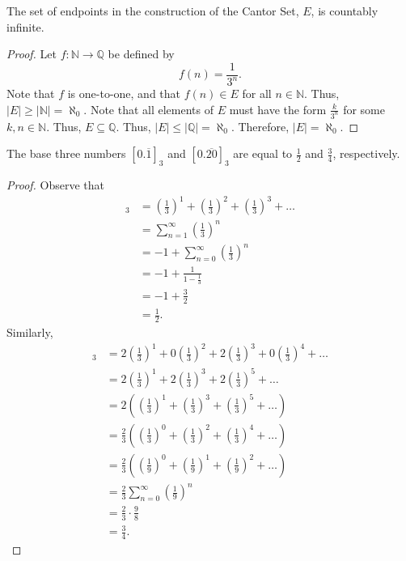\documentclass[12pt]{article}
\begin{document}
\newpage
{} The set of endpoints in the construction of the Cantor Set, $E$, is countably infinite.
\begin{proof}
    Let $f: \mathbb N \to \mathbb Q$ be defined by $$f(n) = \frac{1}{3^n}.$$ Note that $f$ is one-to-one, and that $f(n) \in E$ for all $n \in \mathbb N$. Thus, $|E| \geq |\mathbb N| = \aleph_0$. Note that all elements of $E$ must have the form $\frac k{3^n}$ for some $k,n \in \mathbb N$. Thus, $E \subseteq \mathbb Q$. Thus, $|E| \leq |\mathbb Q| = \aleph_0$. Therefore, $|E| = \aleph_0$.
\end{proof}

\newpage
{} The base three numbers $[0.\overline{1}]_3$ and $[0.\overline{20}]_3$ are equal to $\frac12$ and $\frac34$, respectively.
\begin{proof}
    Observe that
    \begin{align*}
        [0.\overline{1}]_3 &= \left(\frac13\right)^1 + \left(\frac13\right)^2 + \left(\frac13\right)^3 + \hdots \\
                           &= \sum_{n=1}^\infty \left(\frac13\right)^n \\
                           &= -1 + \sum_{n=0}^\infty \left(\frac13\right)^n \\
                           &= -1 + \frac1{1-\frac13} \\
                           &= -1 + \frac32 \\
                           &= \frac12.
    \end{align*}
    Similarly,
    \begin{align*}
        [0.\overline{20}]_3 &= 2\left(\frac13\right)^1 + 0\left(\frac13\right)^2 + 2\left(\frac13\right)^3 + 0\left(\frac13\right)^4 + \hdots \\
                            &= 2\left(\frac13\right)^1 + 2\left(\frac13\right)^3 + 2\left(\frac13\right)^5 + \hdots \\
                            &= 2\left(\left(\frac13\right)^1 + \left(\frac13\right)^3 + \left(\frac13\right)^5 + \hdots \right) \\
                            &= \frac23\left(\left(\frac13\right)^0 + \left(\frac13\right)^2 + \left(\frac13\right)^4 + \hdots \right) \\
                            &= \frac23\left(\left(\frac19\right)^0 + \left(\frac19\right)^1 + \left(\frac19\right)^2 + \hdots \right) \\
                            &= \frac23\sum_{n=0}^\infty \left(\frac19\right)^n \\
                            &= \frac23 \cdot \frac98 \\
                            &= \frac34.
    \end{align*}
\end{proof}
\end{document}
